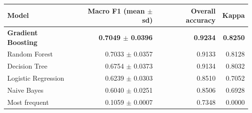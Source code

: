 \begin{tabular}{lrrr}
\toprule
Model & Macro F1 (mean $\pm$ sd) & Overall accuracy & Kappa \\
\midrule
\textbf{Gradient Boosting} & \textbf{0.7049 $\pm$ 0.0396} & \textbf{0.9234} & \textbf{0.8250} \\
Random Forest & 0.7033 $\pm$ 0.0357 & 0.9133 & 0.8128 \\
Decision Tree & 0.6754 $\pm$ 0.0373 & 0.9134 & 0.8032 \\
Logistic Regression & 0.6239 $\pm$ 0.0303 & 0.8510 & 0.7052 \\
Naive Bayes & 0.6040 $\pm$ 0.0251 & 0.8506 & 0.6928 \\
Most frequent & 0.1059 $\pm$ 0.0007 & 0.7348 & 0.0000 \\
\bottomrule
\end{tabular}
